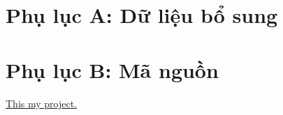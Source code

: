 \appendix
\section{Phụ lục A: Dữ liệu bổ sung}

\section{Phụ lục B: Mã nguồn}

\href{https://github.com/Noname-29-lnin/Viterbi_decoder}{This my project.}

